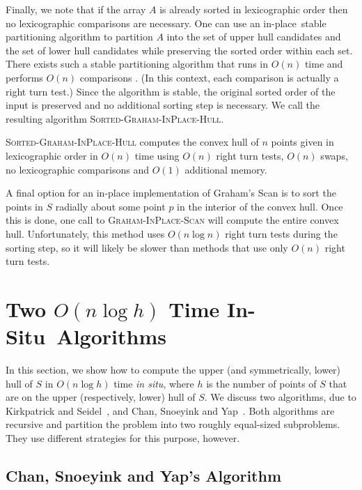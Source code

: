 \documentclass{elsart}
\newcommand{\insitu}{\emph{in situ}}
\newcommand{\inplace}{in-place}
\newcommand{\InSitu}{In-Situ}
\begin{document}
Finally, we note that if the array $A$ is already sorted in
lexicographic order then no lexicographic comparisons are necessary.
One can use an \inplace\ stable partitioning algorithm to partition
$A$ into the set of upper hull candidates and the set of lower hull
candidates while preserving the sorted order within each set.  There
exists such a stable partitioning algorithm that runs in $O(n)$ time
and performs $O(n)$ comparisons \cite{kp92}.  (In this context, each
comparison is actually a right turn test.) Since the algorithm is
stable, the original sorted order of the input is preserved and no
additional sorting step is necessary.  We call the resulting algorithm
\textsc{Sorted-Graham-InPlace-Hull}.

\begin{thm}
\textsc{Sorted-Graham-InPlace-Hull} computes the convex hull of $n$
points given in lexicographic order in $O(n)$ time using $O(n)$ right
turn tests, $O(n)$ swaps, no lexicographic comparisons and $O(1)$
additional memory.
\end{thm}

A final option for an in-place implementation of Graham's Scan is to
sort the points in $S$ radially about some point $p$ in the interior
of the convex hull.  Once this is done, one call to
\textsc{Graham-InPlace-Scan} will compute the entire convex hull.
Unfortunately, this method uses $O(n\log n)$ right turn tests during
the sorting step, so it will likely be slower than methods that use
only $O(n)$ right turn tests.



\section{Two $O(n\log h)$ Time \InSitu\ Algorithms}

In this section, we show how to compute the upper (and symmetrically,
lower) hull of $S$ in $O(n\log h)$ time \insitu, where $h$ is the
number of points of $S$ that are on the upper (respectively, lower)
hull of $S$. We discuss two algorithms, due to Kirkpatrick and
Seidel~\cite{ks86}, and Chan, Snoeyink and Yap~\cite{csy97}. Both
algorithms are recursive and partition the problem into two roughly
equal-sized subproblems. They use different strategies for this
purpose, however.

\subsection{Chan, Snoeyink and Yap's Algorithm}
\end{document}
